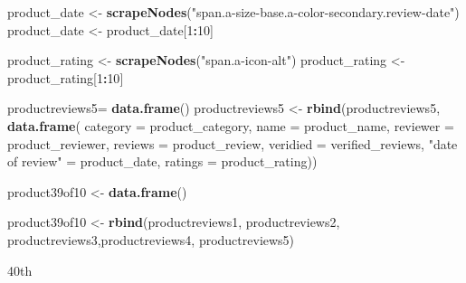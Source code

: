 \documentclass[
]{article}
\newenvironment{Shaded}{\begin{snugshade}}{\end{snugshade}}
\newcommand{\AttributeTok}[1]{\textcolor[rgb]{0.13,0.29,0.53}{#1}}
\newcommand{\DecValTok}[1]{\textcolor[rgb]{0.00,0.00,0.81}{#1}}
\newcommand{\FunctionTok}[1]{\textcolor[rgb]{0.13,0.29,0.53}{\textbf{#1}}}
\newcommand{\NormalTok}[1]{#1}
\newcommand{\OtherTok}[1]{\textcolor[rgb]{0.56,0.35,0.01}{#1}}
\newcommand{\SpecialCharTok}[1]{\textcolor[rgb]{0.81,0.36,0.00}{\textbf{#1}}}
\newcommand{\StringTok}[1]{\textcolor[rgb]{0.31,0.60,0.02}{#1}}
\begin{document}
\begin{Shaded}
\begin{Highlighting}[]
\NormalTok{  product\_date }\OtherTok{\textless{}{-}} \FunctionTok{scrapeNodes}\NormalTok{(}\StringTok{"span.a{-}size{-}base.a{-}color{-}secondary.review{-}date"}\NormalTok{)}
\NormalTok{  product\_date }\OtherTok{\textless{}{-}}\NormalTok{ product\_date[}\DecValTok{1}\SpecialCharTok{:}\DecValTok{10}\NormalTok{]}
  
\NormalTok{  product\_rating }\OtherTok{\textless{}{-}} \FunctionTok{scrapeNodes}\NormalTok{(}\StringTok{"span.a{-}icon{-}alt"}\NormalTok{)}
\NormalTok{  product\_rating }\OtherTok{\textless{}{-}}\NormalTok{ product\_rating[}\DecValTok{1}\SpecialCharTok{:}\DecValTok{10}\NormalTok{]}
  
\NormalTok{  productreviews5}\OtherTok{=} \FunctionTok{data.frame}\NormalTok{()}
\NormalTok{  productreviews5 }\OtherTok{\textless{}{-}} \FunctionTok{rbind}\NormalTok{(productreviews5, }\FunctionTok{data.frame}\NormalTok{(}
                      \AttributeTok{category =}\NormalTok{ product\_category,}
                      \AttributeTok{name =}\NormalTok{ product\_name,}
                      \AttributeTok{reviewer =}\NormalTok{ product\_reviewer,}
                      \AttributeTok{reviews =}\NormalTok{ product\_review,}
                      \AttributeTok{veridied =}\NormalTok{ verified\_reviews,}
                      \StringTok{"date of review"} \OtherTok{=}\NormalTok{ product\_date,}
                      \AttributeTok{ratings =}\NormalTok{ product\_rating))}
  
\NormalTok{  product39of10 }\OtherTok{\textless{}{-}} \FunctionTok{data.frame}\NormalTok{()}
  
\NormalTok{  product39of10 }\OtherTok{\textless{}{-}} \FunctionTok{rbind}\NormalTok{(productreviews1, productreviews2, productreviews3,productreviews4, productreviews5)}
\end{Highlighting}
\end{Shaded}

40th
\end{document}
